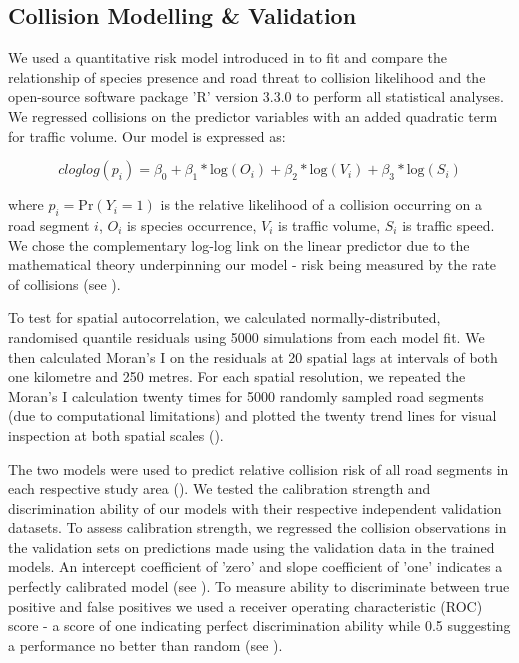 \subsection{Collision Modelling \& Validation}

We used a quantitative risk model introduced in  to fit and compare the relationship of species presence and road threat to collision likelihood and the open-source software package ’R’ version 3.3.0 \citep{rdct16} to perform all statistical analyses. We regressed collisions on the predictor variables with an added quadratic term for traffic volume. Our model is expressed as:

\begin{equation} \label{eq:41}
cloglog(p_i) = \beta_0 + \beta_1*\text{log}(O_i) + \beta_2*\text{log}(V_i) + \beta_3*\text{log}(S_i)
\end{equation}

\noindent where $p_i=\text{Pr}(Y_i=1)$ is the relative likelihood of a collision occurring on a road segment $i$, $O_i$ is species occurrence, $V_i$ is traffic volume, $S_i$ is traffic speed. We chose the complementary log-log link on the linear predictor due to the mathematical theory underpinning our model - risk being measured by the rate of collisions (see ).

To test for spatial autocorrelation, we calculated normally-distributed, randomised quantile residuals \citep{dunn96} using 5000 simulations from each model fit. We then calculated Moran's I on the residuals at 20 spatial lags at intervals of both one kilometre and 250 metres.  For each spatial resolution, we repeated the Moran's I calculation twenty times for 5000 randomly sampled road segments (due to computational limitations) and plotted the twenty trend lines for visual inspection at both spatial scales ().

The two models were used to predict relative collision risk of all road segments in each respective study area ().  We tested the calibration strength and discrimination ability of our models with their respective independent validation datasets. To assess calibration strength, we regressed the collision observations in the validation sets on predictions made using the validation data in the trained models. An intercept coefficient of 'zero' and slope coefficient of 'one' indicates a perfectly calibrated model (see \cite{mill91}). To measure ability to discriminate between true positive and false positives we used a receiver operating characteristic (ROC) score - a score of one indicating perfect discrimination ability while 0.5 suggesting a performance no better than random (see \cite{metz78}).

